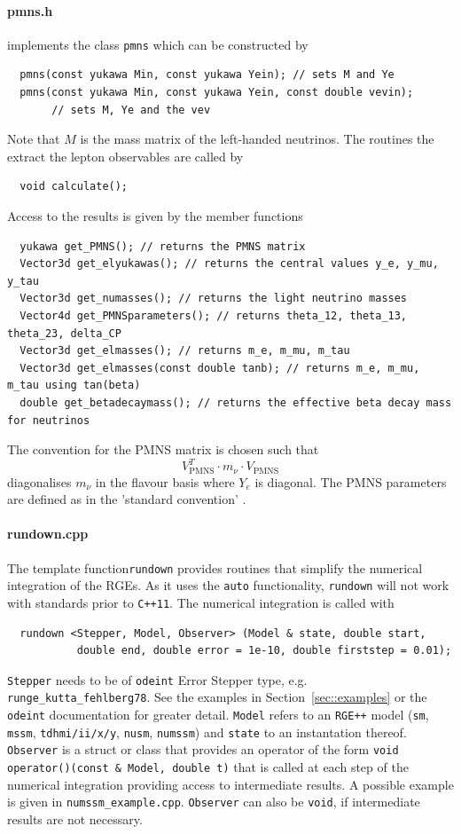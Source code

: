 \documentclass[11pt,a4paper]{article}
\begin{document}
\paragraph{pmns.h}
implements the class \texttt{pmns} which can be constructed by
\begin{lstlisting}
  pmns(const yukawa Min, const yukawa Yein); // sets M and Ye
  pmns(const yukawa Min, const yukawa Yein, const double vevin);
       // sets M, Ye and the vev
\end{lstlisting}
Note that $M$ is the mass matrix of the left-handed neutrinos.
The routines the extract the lepton observables are called by
\begin{lstlisting}
  void calculate();
\end{lstlisting}
Access to the results is given by the member functions
\begin{lstlisting}
  yukawa get_PMNS(); // returns the PMNS matrix
  Vector3d get_elyukawas(); // returns the central values y_e, y_mu, y_tau
  Vector3d get_numasses(); // returns the light neutrino masses
  Vector4d get_PMNSparameters(); // returns theta_12, theta_13, theta_23, delta_CP
  Vector3d get_elmasses(); // returns m_e, m_mu, m_tau
  Vector3d get_elmasses(const double tanb); // returns m_e, m_mu, m_tau using tan(beta)
  double get_betadecaymass(); // returns the effective beta decay mass for neutrinos
\end{lstlisting}
The convention for the PMNS matrix is chosen such that
\begin{equation}
  V_{\mathrm{PMNS}}^T \cdot m_\nu \cdot V_{\mathrm{PMNS}}
\end{equation}
diagonalises $m_\nu$ in the flavour basis where $Y_e$ is diagonal. The PMNS parameters are defined as in the 'standard convention' \cite{Patrignani:2016xqp}.

\paragraph{rundown.cpp}
The template function\texttt{rundown} provides routines that simplify the numerical integration of the RGEs. As it uses the \texttt{auto} functionality, \texttt{rundown} will not work with standards prior to \texttt{C++11}. The numerical integration is called with
\begin{lstlisting}
  rundown <Stepper, Model, Observer> (Model & state, double start,
           double end, double error = 1e-10, double firststep = 0.01);
\end{lstlisting}
\texttt{Stepper} needs to be of \texttt{odeint} Error Stepper type, e.g. \texttt{runge\_kutta\_fehlberg78}. See the examples in Section~\ref{sec::examples} or the \texttt{odeint} documentation for greater detail. \texttt{Model} refers to an \texttt{RGE++} model (\texttt{sm}, \texttt{mssm}, \texttt{tdhmi/ii/x/y}, \texttt{nusm}, \texttt{numssm}) and \texttt{state} to an instantation thereof. \texttt{Observer} is a struct or class that provides an operator of the form \texttt{void operator()(const \& Model, double t)} that is called at each step of the numerical integration providing access to intermediate results. A possible example is given in \texttt{numssm\_example.cpp}. \texttt{Observer} can also be \texttt{void}, if intermediate results are not necessary.
\end{document}
